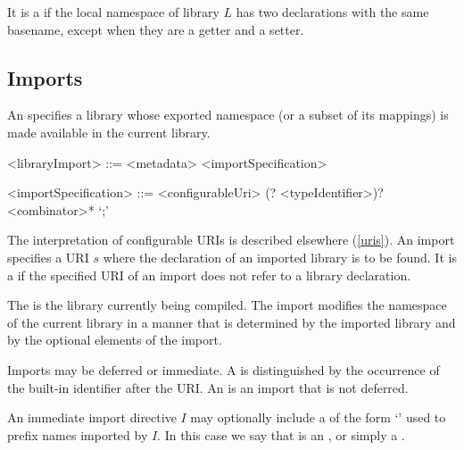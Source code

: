 \documentclass[makeidx]{article}
\begin{document}
{\LMHash{}%
It is a  if the local namespace of library $L$
has two declarations with the same basename,
except when they are a getter and a setter.



\subsection{Imports}

\LMHash{}%
An  specifies a library whose exported namespace
(or a subset of its mappings) is made available in the current library.

\begin{grammar}
<libraryImport> ::= <metadata> <importSpecification>

<importSpecification> ::= \gnewline{}
  \IMPORT{} <configurableUri>
  (\DEFERRED? \AS{} <typeIdentifier>)?
  <combinator>* `;'
\end{grammar}

\LMHash{}%
The interpretation of configurable URIs is described elsewhere
(\ref{uris}).
An import specifies a URI $s$
where the declaration of an imported library is to be found.
It is a  if the specified URI of an import
does not refer to a library declaration.

\LMHash{}%
The  is the library currently being compiled.
The import modifies the namespace of the current library
in a manner that is determined by the imported library and
by the optional elements of the import.

\LMHash{}%
Imports may be deferred or immediate.
A
is distinguished by the occurrence of
the built-in identifier \DEFERRED{} after the URI.
An
is an import that is not deferred.

\LMHash{}%
An immediate import directive $I$ may optionally include
a  of the form `\code{\AS\,\,\id}' used to prefix
names imported by $I$.
In this case we say that \id{} is an ,
or simply a .


}
\end{document}

